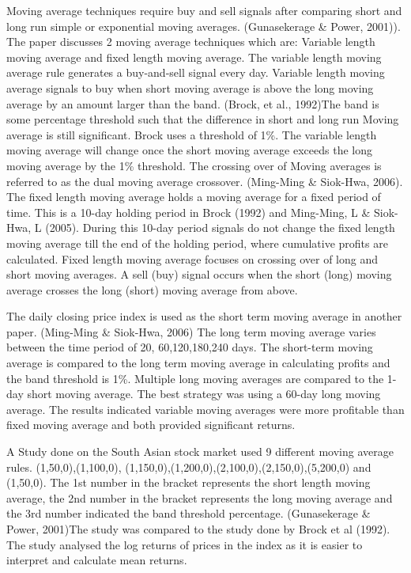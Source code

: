 \documentclass[12pt,preprint, authoryear]{elsarticle}
\numberwithin{equation}{section}
\numberwithin{figure}{section}
\numberwithin{table}{section}
\begin{document}
Moving average techniques require buy and sell signals after comparing
short and long run simple or exponential moving averages. (Gunasekerage
\& Power, 2001)). The paper discusses 2 moving average techniques which
are: Variable length moving average and fixed length moving average. The
variable length moving average rule generates a buy-and-sell signal
every day. Variable length moving average signals to buy when short
moving average is above the long moving average by an amount larger than
the band. (Brock, et al., 1992)The band is some percentage threshold
such that the difference in short and long run Moving average is still
significant. Brock uses a threshold of 1\%. The variable length moving
average will change once the short moving average exceeds the long
moving average by the 1\% threshold. The crossing over of Moving
averages is referred to as the dual moving average crossover. (Ming-Ming
\& Siok-Hwa, 2006). The fixed length moving average holds a moving
average for a fixed period of time. This is a 10-day holding period in
Brock (1992) and Ming-Ming, L \& Siok-Hwa, L (2005). During this 10-day
period signals do not change the fixed length moving average till the
end of the holding period, where cumulative profits are calculated.
Fixed length moving average focuses on crossing over of long and short
moving averages. A sell (buy) signal occurs when the short (long) moving
average crosses the long (short) moving average from above.

The daily closing price index is used as the short term moving average
in another paper. (Ming-Ming \& Siok-Hwa, 2006) The long term moving
average varies between the time period of 20, 60,120,180,240 days. The
short-term moving average is compared to the long term moving average in
calculating profits and the band threshold is 1\%. Multiple long moving
averages are compared to the 1-day short moving average. The best
strategy was using a 60-day long moving average. The results indicated
variable moving averages were more profitable than fixed moving average
and both provided significant returns.

A Study done on the South Asian stock market used 9 different moving
average rules. (1,50,0),(1,100,0),
(1,150,0),(1,200,0),(2,100,0),(2,150,0),(5,200,0) and (1,50,0). The 1st
number in the bracket represents the short length moving average, the
2nd number in the bracket represents the long moving average and the 3rd
number indicated the band threshold percentage. (Gunasekerage \& Power,
2001)The study was compared to the study done by Brock et al (1992). The
study analysed the log returns of prices in the index as it is easier to
interpret and calculate mean returns.
\end{document}
